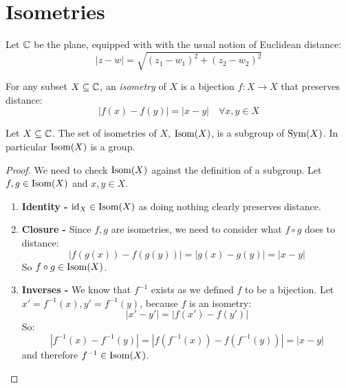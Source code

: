 \documentclass[../main.tex]{subfiles}
\begin{document}
\section{Isometries}
Let $\mathbb{C}$ be the plane, equipped with with the usual notion of Euclidean distance:
\[
   |z-w| = \sqrt{(z_1 - w_1)^2 + (z_2 - w_2)^2}
\]
\begin{definition}[Isometry]
  For any subset $X \subseteq \mathbb{C}$, an \textit{isometry} of $X$ is a bijection $f: X \to X$ that preserves distance:
  \[
    |f(x) - f(y)| = |x - y| \quad \forall x, y \in X
  \]
\end{definition}
\begin{proposition}
  Let $X \subseteq \mathbb{C}$.
  The set of isometries of $X$, $\operatorname{Isom}(X)$, is a subgroup of $\operatorname{Sym}(X)$.
  In particular $\operatorname{Isom}(X)$ is a group.
\end{proposition}
\begin{proof}
  We need to check $\operatorname{Isom}(X)$ against  the definition of a subgroup.
  Let $f, g \in \operatorname{Isom}(X)$ and $x, y \in X$.
  \begin{enumerate}
    \item \textbf{Identity -} $\mathrm{id}_X \in \operatorname{Isom}(X)$ as doing nothing clearly preserves distance.
    \item \textbf{Closure -} Since $f, g$ are isometries, we need to consider what $f \circ g$ does to distance:
      \[
        |f(g(x)) - f(g(y))| = |g(x) - g(y)| = |x - y|
      \]
      So $f \circ g \in \operatorname{Isom}(X)$.
    \item \textbf{Inverses -} We know that $f^{-1}$ exists as we defined $f$ to be a bijection.
      Let $x' = f^{-1}(x), y' = f^{-1}(y)$, because $f$ is an isometry:
      \[
        |x' - y'| = |f(x') - f(y')|
      \]
      So:
      \[
        |f^{-1}(x) - f^{-1}(y)| = |f(f^{-1}(x)) - f(f^{-1}(y))| = |x - y|
      \]
      and therefore $f^{-1} \in \operatorname{Isom}(X)$.
  \end{enumerate}
\end{proof}
\end{document}
